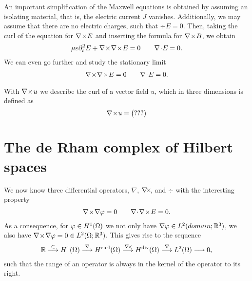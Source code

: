 \begin{intro}
  An important simplification of the Maxwell equations is obtained by
  assuming an isolating material, that is, the electric current $J$
  vanishes. Additionally, we may assume that there are no electric
  charges, such that $\div E=0$. Then, taking the curl of the equation
  for $\nabla\!\times\! E$ and inserting the formula for $\nabla\!\times\! B$, we obtain
  \begin{gather}
    \mu\varepsilon \partial_t^2 E + \nabla\!\times\!\nabla\!\times\! E = 0
    \qquad \nabla\!\cdot\! E=0.
  \end{gather}
  We can even go further and study the stationary limit
  \begin{gather}
    \nabla\!\times\!\nabla\!\times\! E=0 \qquad \nabla\!\cdot\! E=0.
  \end{gather}
\end{intro}

\begin{Notation}
  With $\nabla\!\times\! u$ we describe the curl of a vector field $u$, which in
  three dimensions is defined as
  \begin{gather}
    \nabla\!\times\! u =
    \begin{pmatrix}
      ???
    \end{pmatrix}
  \end{gather}
\end{Notation}

\section{The de Rham complex of Hilbert spaces}

\begin{intro}
  We now know three differential operators, $\nabla$, $\nabla\!\times\!$, and
  $\div$ with the interesting property
  \begin{gather}
    \nabla\!\times\!\nabla \varphi = 0
    \qquad \nabla\!\cdot\!\nabla\!\times\! E=0.
  \end{gather}
  As a consequence, for $\varphi\in H^1(\Omega)$ we not only have
  $\nabla \varphi\in L^2(domain;\mathbb R^3)$, we also have
  $\nabla\!\times\!\nabla\varphi=0\in L^2(\Omega;\mathbb R^3)$. This gives rise to the sequence
  \begin{gather}
    \mathbb R
    \overset{\subset}{\longrightarrow} H^1(\Omega)
    \overset{\nabla}{\longrightarrow} H^{\text{curl}}(\Omega)
    \overset{\nabla\!\times\!}{\longrightarrow} H^{\text{div}}(\Omega)
    \overset{\nabla\!\cdot\!}{\longrightarrow} L^2(\Omega)
    \longrightarrow 0,
  \end{gather}
  such that the range of an operator is always in the kernel of the
  operator to its right.
\end{intro}

